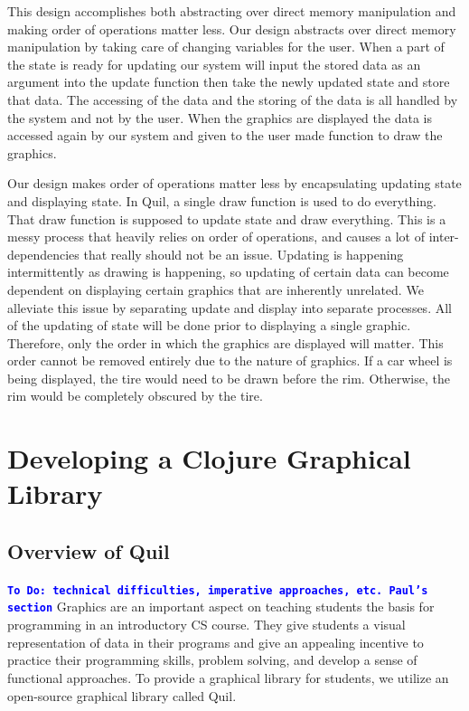 \documentclass[12pt]{article}
\newcommand{\comment}[1]{{\bf \tt  {#1}}}
\newcommand{\todo}[1]{\textcolor{blue}{\comment{To Do: {#1}}}}
\begin{document}
This design accomplishes both abstracting over direct memory manipulation and making order of operations matter less. Our design abstracts over direct memory manipulation by taking care of changing variables for the user. When a part of the state is ready for updating our system will input the stored data as an argument into the update function then take the newly updated state and store that data. The accessing of the data and the storing of the data is all handled by the system and not by the user. When the graphics are displayed the data is accessed again by our system and given to the user made function to draw the graphics. 

Our design makes order of operations matter less by encapsulating updating state and displaying state. In Quil, a single draw function is used to do everything. That draw function is supposed to update state and draw everything. This is a messy process that heavily relies on order of operations, and causes a lot of inter-dependencies that really should not be an issue. Updating is happening intermittently as drawing is happening, so updating of certain data can become dependent on displaying certain graphics that are inherently unrelated. We alleviate this issue by separating update and display into separate processes. All of the updating of state will be done prior to displaying a single graphic. Therefore, only the order in which the graphics are displayed will matter. This order cannot be removed entirely due to the nature of graphics. If a car wheel is being displayed, the tire would need to be drawn before the rim. Otherwise, the rim would be completely obscured by the tire.

\section{Developing a Clojure Graphical Library}\label{sec:library}



\subsection{Overview of Quil}\label{subsec:quil}
\todo{technical difficulties, imperative approaches, etc. Paul's section}
Graphics are an important aspect on teaching students the basis for programming in an introductory CS course. They give students a visual representation of data in their programs and give an appealing incentive to practice their programming skills, problem solving, and develop a sense of functional approaches. To provide a graphical library for students, we utilize an open-source graphical library called Quil.
\end{document}
